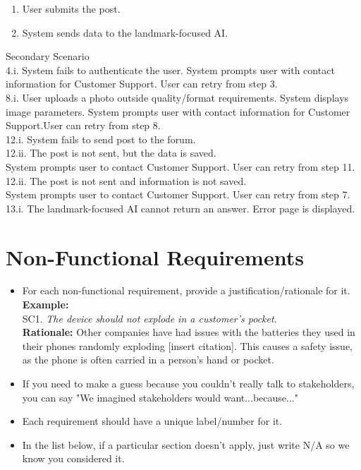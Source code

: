 \documentclass[]{article}
\begin{document}
\begin{enumerate}[{\bf BE1.}]
\begin{enumerate}[{1.}]
                    \item User submits the post.
                    \item System sends data to the landmark-focused AI. 
                \end{enumerate}
                    Secondary Scenario \\
                    4.i. System fails to authenticate the user. 
                    System prompts user with contact information for Customer Support. User can retry from step 3. \\
                    8.i. User uploads a photo outside quality/format requirements. System displays image parameters. System prompts user with contact information for Customer Support.User can retry from step 8. \\
                    12.i. System fails to send post to the forum. \\
	            12.ii. 	The post is not sent, but the data is saved. \\
                    System prompts user to contact Customer Support. User can retry from step 11. \\
	            12.ii. 	The post is not sent and information is not        saved.\\ 
                    System prompts user to contact Customer Support. User can retry from step 7. \\
                    13.i. The landmark-focused AI cannot return an answer. Error page is displayed. \\

	\end{enumerate}

\section{Non-Functional Requirements}
\label{sec:non-functional_requirements}


\begin{itemize}
	\item For each non-functional requirement, provide a justification/rationale for it.\\
	{\bf Example:} \\
	SC1. \emph{The device should not explode in a customer’s pocket.}\\
	{\bf Rationale:} Other companies have had issues with the batteries they used in their phones randomly exploding [insert citation]. This causes a safety issue, as the phone is often carried in a person's hand or pocket.	
	\item If you need to make a guess because you couldn't really talk to stakeholders, you can say "We imagined stakeholders would want...because..."
	\item Each requirement should have a unique label/number for it.
	\item In the list below, if a particular section doesn't apply, just write N/A so we know you considered it.
\end{itemize}
\end{document}
